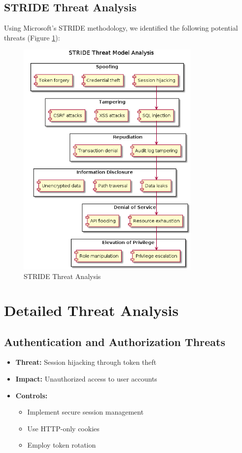 \documentclass{article}
\begin{document}
\subsection{STRIDE Threat Analysis}
Using Microsoft's STRIDE methodology, we identified the following potential threats (Figure \ref{fig:stride-analysis}):

\begin{figure}[H]
    \centering
    \includegraphics[width=0.8\textwidth]{images/stride-analysis}
    \caption{STRIDE Threat Analysis}
    \label{fig:stride-analysis}
\end{figure}

\section{Detailed Threat Analysis}

\subsection{Authentication and Authorization Threats}
\begin{itemize}
    \item \textbf{Threat:} Session hijacking through token theft
    \item \textbf{Impact:} Unauthorized access to user accounts
    \item \textbf{Controls:}
    \begin{itemize}
        \item Implement secure session management
        \item Use HTTP-only cookies
        \item Employ token rotation
    \end{itemize}
\end{itemize}
\end{document}
